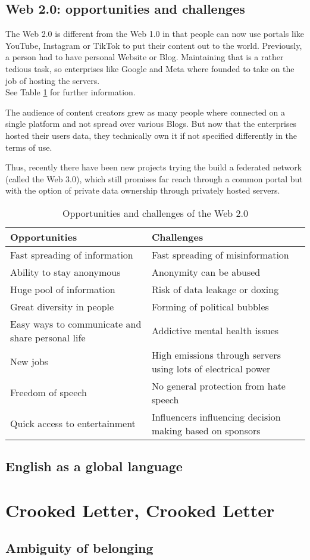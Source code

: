 \documentclass[10pt]{article}
\begin{document}
\subsection{Web 2.0: opportunities and challenges}
	\label{ssec:media@web2}
The Web 2.0 is different from the Web 1.0 in that people can now use portals like YouTube, Instagram
or TikTok to put their content out to the world. Previously, a person had to have personal
Website or Blog. Maintaining that is a rather tedious task, so enterprises like Google and Meta where
founded to take on the job of hosting the servers. \\ See Table \ref{tab:web2} for further information.

The audience of content creators grew as many people where connected
on a single platform and not spread over various Blogs. But now that the enterprises hosted their users data, they
technically own it if not specified differently in the terms of use.

Thus, recently there
have been new projects trying the build a federated network (called the Web 3.0), which still promises far reach
through a common portal but with the option of private data ownership through privately hosted
servers.
\begin{table}[htbp]
	\centering
	\begin{tabularx}{\textwidth}{X X}
		\hline
		{\sffamily\bfseries Opportunities} & {\sffamily\bfseries Challenges} \\ \hline
		Fast spreading of information & Fast spreading of misinformation \\
		Ability to stay anonymous & Anonymity can be abused \\
		Huge pool of information & Risk of data leakage or doxing \\
		Great diversity in people & Forming of political bubbles \\
		Easy ways to communicate and share personal life & Addictive \linebreak\rightarrow  mental health issues \\
		New jobs & High emissions through servers using lots of electrical power \\
		Freedom of speech & No general protection from hate speech\\
		Quick access to entertainment & Influencers influencing decision making based on sponsors \\ \hline
	\end{tabularx}
	\caption{Opportunities and challenges of the Web 2.0}
	\label{tab:web2}
\end{table}

\subsection{English as a global language}
	\label{ssec:media@english}
\section{Crooked Letter, Crooked Letter}
	\label{sec:crookedl}
\subsection{Ambiguity of belonging}
	\label{ssec:crookedl@ambofbelonging}
\end{document}
